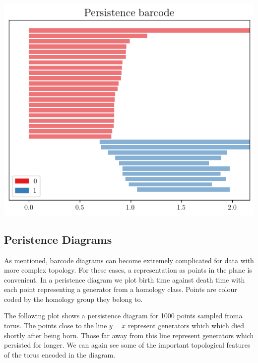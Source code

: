 \begin{center}
\includegraphics[scale=0.8]{figures/torus_barcode.png}
\end{center}


\subsection{Peristence Diagrams}

As mentioned, barcode diagrams can become extremely complicated for data with more complex topology. For these cases, a representation as points in the plane is convenient. In a peristence diagram we plot birth time against death time with each point representing a generator from a homology class. Points are colour coded by the homology group they belong to.

The following plot shows a persistence diagram for 1000 points sampled froma  torus. The points close to the line $y = x$ represent generators which which died shortly after being born. Those far away from this line represent generators which persisted for longer. We can again see some of the important topological features of the torus encoded in the diagram.

